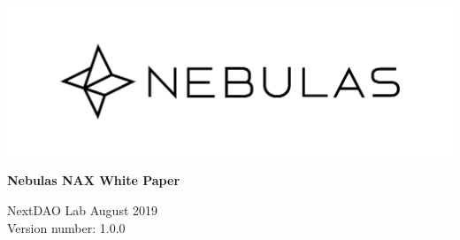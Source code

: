 \documentclass[12pt]{article}
\begin{document}
\pagestyle{empty}


\begin{titlepage}
  \begin{center}
    \vspace*{5.5cm}
    \includegraphics[scale=0.4]{../common/Nebulas.png}
    \vspace{0.5cm}

    \textbf{\huge{Nebulas NAX White Paper}}

    \vspace{0.5cm}
    NextDAO Lab
    \vfill
    August 2019 \\
    Version number: 1.0.0
    \textbf{}
  \end{center}

\end{titlepage}
\setcounter{page}{0}
\tableofcontents
\newpage
\setcounter{page}{1}
\pagestyle{fancy}
\vspace*{0.01cm}
%





\newpage


\newpage 
\begin{appendices}


\end{appendices}
\end{document}
